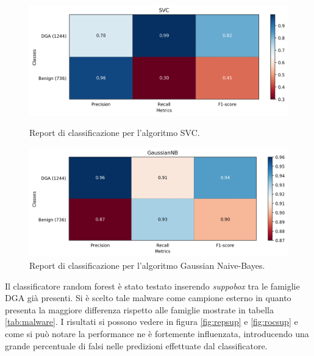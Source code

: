 \begin{figure}[htbp]
  	\centering
    \includegraphics[width=.85\columnwidth]{figures/report_SVC.png}
    \caption{Report di classificazione per l'algoritmo SVC.\label{fig:repsvc}}

	\centering
    \includegraphics[width=.85\columnwidth]{figures/report_GaussianNB.png}
    \caption{Report di classificazione per l'algoritmo Gaussian Naive-Bayes.\label{fig:repgnb}}
\end{figure}

Il classificatore random forest è stato testato inserendo \textit{suppobox} tra le famiglie DGA già presenti. Si è scelto tale malware come campione esterno in quanto presenta la maggiore differenza rispetto alle famiglie mostrate in tabella \ref{tab:malware}. I risultati si possono vedere in figura \ref{fig:repsup} e \ref{fig:rocsup} e come si può notare la performance ne è fortemente influenzata, introducendo una grande percentuale di falsi nelle predizioni effettuate dal classificatore.


